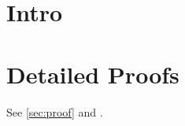 \documentclass[twocolumn,unicode]{wrapper}
\begin{document}
\wrapperclass\articleclass\layoutmode\hypermode
\tableofcontents
\section{Intro}
\appendix
\section{Detailed Proofs}\label{sec:proof}
See \autoref{sec:proof} and .
\end{document}
